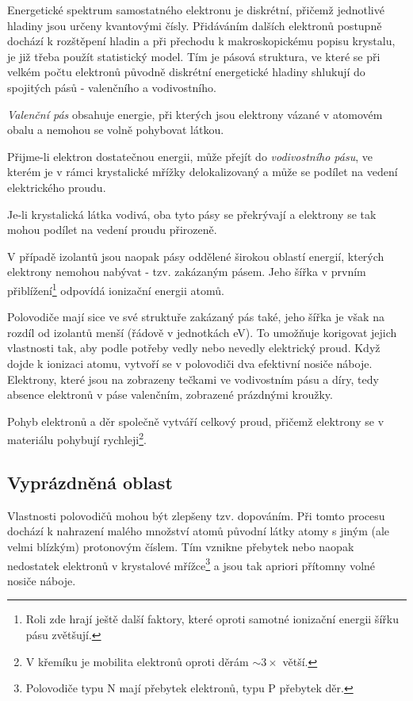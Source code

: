 
Energetické spektrum samostatného elektronu je diskrétní, přičemž jednotlivé hladiny jsou určeny kvantovými čísly. Přidáváním dalších elektronů postupně dochází k rozštěpení hladin a při přechodu k makroskopickému popisu krystalu, je již třeba použít statistický model. Tím je pásová struktura, ve které se při velkém počtu elektronů původně diskrétní energetické hladiny shlukují do spojitých pásů - valenčního a vodivostního.

\textit{Valenční pás} obsahuje energie, při kterých jsou elektrony vázané v atomovém obalu a nemohou se volně pohybovat látkou. 

Přijme-li elektron dostatečnou energii, může přejít do \textit{vodivostního pásu}, ve kterém je v rámci krystalické mřížky delokalizovaný a může se podílet na vedení elektrického proudu.

Je-li krystalická látka vodivá, oba tyto pásy se překrývají a elektrony se tak mohou podílet na vedení proudu přirozeně. 

V případě izolantů jsou naopak pásy oddělené širokou oblastí energií, kterých elektrony nemohou nabývat - tzv. zakázaným pásem. Jeho šířka v prvním přiblížení\footnote{Roli zde hrají ještě další faktory, které oproti samotné ionizační energii šířku pásu zvětšují.} odpovídá ionizační energii atomů. 

Polovodiče mají sice ve své struktuře zakázaný pás také, jeho šířka je však na rozdíl od izolantů menší (řádově v jednotkách eV). To umožňuje korigovat jejich vlastnosti tak, aby podle potřeby vedly nebo nevedly elektrický proud. Když dojde k ionizaci atomu, vytvoří se v polovodiči dva efektivní nosiče náboje. Elektrony, které jsou na  zobrazeny tečkami ve vodivostním pásu a díry, tedy absence elektronů v páse valenčním, zobrazené prázdnými kroužky.

Pohyb elektronů a děr společně vytváří celkový proud, přičemž elektrony se v materiálu pohybují rychleji\footnote{V křemíku je mobilita elektronů oproti děrám $\sim 3 \times$ větší.}.

\subsection{Vyprázdněná oblast}
Vlastnosti polovodičů mohou být zlepšeny tzv. dopováním. Při tomto procesu dochází k nahrazení malého množství atomů původní látky atomy s jiným (ale velmi blízkým) protonovým číslem. Tím vznikne přebytek nebo naopak nedostatek elektronů v krystalové mřížce\footnote{Polovodiče typu N mají přebytek elektronů, typu P přebytek děr.} a jsou tak apriori přítomny volné nosiče náboje.

